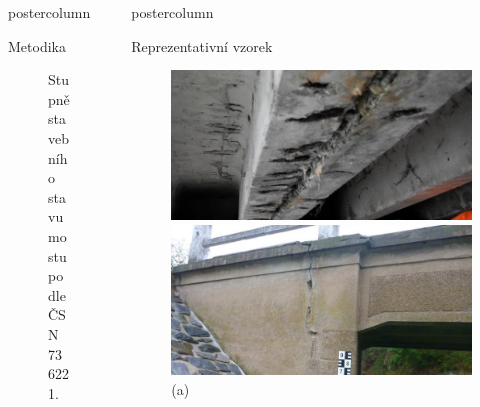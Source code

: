 \documentclass{beamer}
\newlength{\columnheight}
\begin{document}
\begin{frame}
\begin{columns}
\begin{column}{.4\textwidth}
\begin{beamercolorbox}[center]{postercolumn}
\begin{minipage}{.98\textwidth}
{\begin{myblock}{Metodika}
\begin{figure}
							\caption{Stupně stavebního stavu mostu podle ČSN 73 6221.}
							\label{fig:stupne}
						\end{figure}
					\end{myblock}\vfill
		}\end{minipage}\end{beamercolorbox}
	\end{column}
	\begin{column}{.60\textwidth}
		\begin{beamercolorbox}[center]{postercolumn}
			\begin{minipage}{.98\textwidth} %
				\parbox[t][\columnheight]{\textwidth}{ %
					\begin{myblock}{Reprezentativní vzorek}
						\vskip 0.4cm
						\begin{figure}
							\begin{minipage}{0.4\textwidth}
								\centering\includegraphics[width=1\textwidth]{img/1a}
								\caption*{(a)}
							\end{minipage}
							\hspace{1em}
							\begin{minipage}{0.4\textwidth}
								\centering\includegraphics[width=1\textwidth]{img/1b}

\end{minipage}
\end{figure}
\end{myblock}}
\end{minipage}
\end{beamercolorbox}
\end{column}
\end{columns}
\end{frame}
\end{document}
